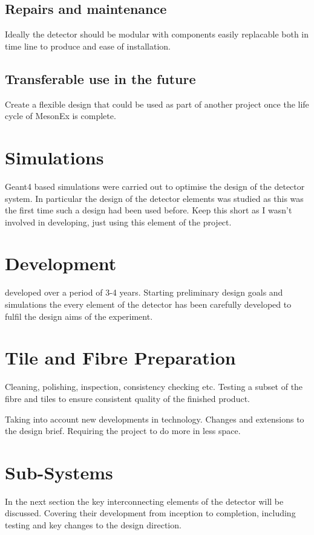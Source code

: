 \subsection{Repairs and maintenance}
Ideally the detector should be modular with components easily replacable both in time line to produce and ease of installation.
\subsection{Transferable use in the future}
Create a flexible design that could be used as part of another project once the life cycle of MesonEx is complete.
\section{Simulations}
Geant4 based simulations were carried out to optimise the design of the detector system. In particular the design of the detector elements was studied as this was the first time such a design had been used before. Keep this short as I wasn't involved in developing, just using this element of the project.
\cite{golovko2008use}
\section{Development}
developed over a period of 3-4 years. Starting preliminary design goals and simulations the every element of the detector has been carefully developed to fulfil the design aims of the experiment.
\section{Tile and Fibre Preparation}
Cleaning, polishing, inspection, consistency checking etc. Testing a subset of the fibre and tiles to ensure consistent quality of the finished product.
\cite{hanlet1999comparison}

Taking into account new developments in technology.
Changes and extensions to the design brief. Requiring the project to do more in less space.
\section{Sub-Systems}
In the next section the key interconnecting elements of the detector will be discussed. Covering their development from inception to completion, including testing and key changes to the design direction. 
